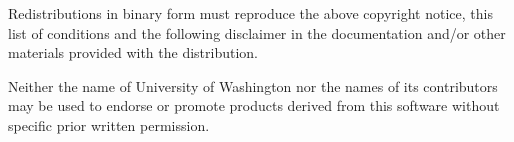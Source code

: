 \begin{DoxyItemize}
\item Redistributions in binary form must reproduce the above copyright notice, this list of conditions and the following disclaimer in the documentation and/or other materials provided with the distribution.\end{DoxyItemize}
\begin{DoxyItemize}
\item Neither the name of University of Washington nor the names of its contributors may be used to endorse or promote products derived from this software without specific prior written permission.\end{DoxyItemize}
\begin{DoxyParagraph}{}

\end{DoxyParagraph}
